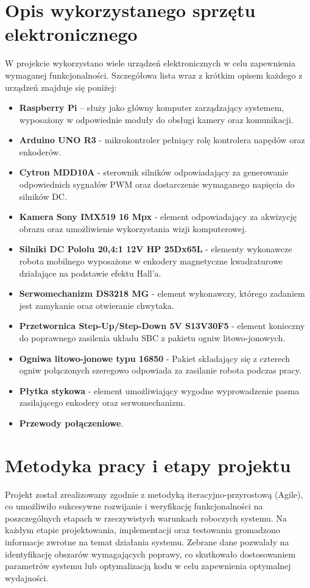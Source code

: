 \section{Opis wykorzystanego sprzętu elektronicznego}
W projekcie wykorzystano wiele urządzeń elektronicznych w celu zapewnienia wymaganej funkcjonalności. Szczegółowa lista wraz z krótkim opisem każdego z urządzeń znajduje się poniżej:

\begin{itemize}
    \item \textbf{Raspberry Pi} – służy jako główny komputer zarządzający systemem, wyposażony w odpowiednie moduły do obsługi kamery oraz komunikacji.
    \item \textbf{Arduino UNO R3} - mikrokontroler pełniący rolę kontrolera napędów oraz enkoderów.
    \item \textbf{Cytron MDD10A} - sterownik silników odpowiadający za generowanie odpowiednich sygnałów PWM oraz dostarczenie wymaganego napięcia do silników DC.
    \item \textbf{Kamera Sony IMX519 16 Mpx} - element odpowiadający za akwizycję obrazu oraz umożliwienie wykorzystania wizji komputerowej. 
    \item \textbf{Silniki DC Pololu 20,4:1 12V HP 25Dx65L} - elementy wykonawcze robota mobilnego wyposażone w enkodery magnetyczne kwadraturowe działające na podstawie efektu Hall'a.
    \item \textbf{Serwomechanizm DS3218 MG} - element wykonawczy, którego zadaniem jest zamykanie oraz otwieranie chwytaka.
    \item \textbf{Przetwornica Step-Up/Step-Down 5V S13V30F5} - element konieczny do poprawnego zasilenia układu SBC z pakietu ogniw litowo-jonowych.
    \item \textbf{Ogniwa litowo-jonowe typu 16850} - Pakiet składający się z czterech ogniw połączonych szeregowo odpowiada za zasilanie robota podczas pracy. 
    \item \textbf{Płytka stykowa} - element umożliwiający wygodne wyprowadzenie pasma zasilającego enkodery oraz serwomechanizm. 
    \item \textbf{Przewody połączeniowe}. 
    
\end{itemize}

\section{Metodyka pracy i etapy projektu}
Projekt został zrealizowany zgodnie z metodyką iteracyjno-przyrostową (Agile), co umożliwiło sukcesywne rozwijanie i weryfikację funkcjonalności na poszczególnych etapach w rzeczywistych warunkach roboczych systemu. Na każdym etapie projektowania, implementacji oraz testowania gromadzono informacje zwrotne na temat działania systemu. Zebrane dane pozwalały na identyfikację obszarów wymagających poprawy, co skutkowało dostosowaniem parametrów systemu lub optymalizacją kodu w celu zapewnienia optymalnej wydajności.

